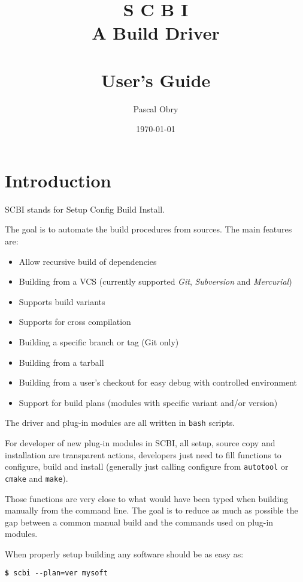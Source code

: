 \documentclass[a4paper,12pt,twoside]{article}
\title{{\Huge S C B I} \\
	{\large  A Build Driver \version} \\
	\hfill \\
	User's Guide}
\author{Pascal Obry}
\date{\today}
\newcommand{\code}[1]{\texttt{#1}}
\renewcommand{\emph}[1]{\textit{#1}}
\newcommand{\cmd}[1]{\tabto{1cm}\hspace{0.5cm}\texttt{\textbf{\$} #1}}
\let\stdsection\section
\renewcommand\section{\newpage\stdsection}
\newcommand{\ddash}{-{}-}
\begin{document}
\maketitle

%

\tableofcontents


\section{Introduction}

SCBI stands for Setup Config Build Install.

The goal is to automate the build procedures from sources. The main features are:

\begin{itemize}
	\item Allow recursive build of dependencies
	\item Building from a VCS (currently supported \emph{Git}, \emph{Subversion} and \emph{Mercurial})
	\item Supports build variants
	\item Supports for cross compilation
	\item Building a specific branch or tag (Git only)
	\item Building from a tarball
	\item Building from a user's checkout for easy debug with controlled environment
	\item Support for build plans (modules with specific variant and/or version)
\end{itemize}

The driver and plug-in modules are all written in \code{bash} scripts.

For developer of new plug-in modules in SCBI, all setup, source copy and installation are transparent actions, developers just need to fill functions to configure, build and install (generally just calling configure from \code{autotool} or \code{cmake} and \code{make}).

Those functions are very close to what would have been typed when building manually from the command line. The goal is to reduce as much as possible the gap between a common manual build and the commands used on plug-in modules.

When properly setup building any software should be as easy as:

\cmd{scbi \ddash{}plan=ver mysoft}
\end{document}
